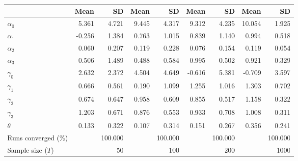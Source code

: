 
\begin{tabular}[t]{lrrrrrrrr}
\toprule
  & Mean & SD & Mean  & SD  & Mean   & SD   & Mean    & SD   \\
\midrule
$\alpha_{0}$ & 5.361 & 4.721 & 9.445 & 4.317 & 9.312 & 4.235 & 10.054 & 1.925\\
$\alpha_{1}$ & -0.256 & 1.384 & 0.763 & 1.015 & 0.839 & 1.140 & 0.994 & 0.518\\
$\alpha_{2}$ & 0.060 & 0.207 & 0.119 & 0.228 & 0.076 & 0.154 & 0.119 & 0.054\\
$\alpha_{3}$ & 0.506 & 1.489 & 0.488 & 0.584 & 0.995 & 0.502 & 0.921 & 0.329\\
$\gamma_{0}$ & 2.632 & 2.372 & 4.504 & 4.649 & -0.616 & 5.381 & -0.709 & 3.597\\
$\gamma_{1}$ & 0.666 & 0.561 & 0.190 & 1.099 & 1.255 & 1.016 & 1.303 & 0.702\\
$\gamma_{2}$ & 0.674 & 0.647 & 0.958 & 0.609 & 0.855 & 0.517 & 1.158 & 0.322\\
$\gamma_{3}$ & 1.203 & 0.671 & 0.876 & 0.553 & 0.933 & 0.708 & 1.008 & 0.311\\
$\theta$ & 0.133 & 0.322 & 0.107 & 0.314 & 0.151 & 0.267 & 0.356 & 0.241\\
Runs converged (\%) &  & 100.000 &  & 100.000 &  & 100.000 &  & 100.000\\
Sample size ($T$) &  & 50 &  & 100 &  & 200 &  & 1000\\
\bottomrule
\end{tabular}
